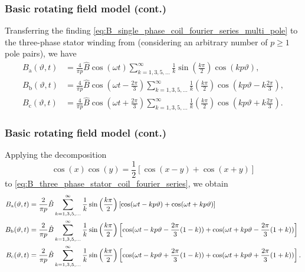 \begin{frame}
	\frametitle{Basic rotating field model (cont.)}
    Transferring the finding \eqref{eq:B_single_phase_coil_fourier_series_multi_pole} to the three-phase stator winding from  (considering an arbitrary number of $p \geq 1$ pole pairs), we have
    \begin{equation}
        \begin{split}
            B_\mathrm{a}(\vartheta, t) &= \frac{4}{\pi p} \hat{B} \cos(\omega t)\sum_{k=1,3,5,\ldots}^{\infty}   \frac{1}{k}\sin\left(\frac{k \pi}{2}\right) \cos(k p \vartheta),\\
            B_\mathrm{b}(\vartheta, t) &= \frac{4}{\pi p} \hat{B} \cos\left(\omega t - \frac{2\pi}{3}\right)\sum_{k=1,3,5,\ldots}^{\infty}   \frac{1}{k}\left(\frac{k \pi}{2}\right) \cos\left(k p \vartheta - k\frac{2\pi}{3} \right),\\ 
            B_\mathrm{c}(\vartheta, t) &= \frac{4}{\pi p} \hat{B} \cos\left(\omega t + \frac{2\pi}{3}\right)\sum_{k=1,3,5,\ldots}^{\infty}   \frac{1}{k}\left(\frac{k \pi}{2}\right) \cos\left(k p \vartheta +  k \frac{2\pi}{3}\right).
        \end{split}
        \label{eq:B_three_phase_stator_coil_fourier_series}
    \end{equation}
\end{frame}

\begin{frame}
	\frametitle{Basic rotating field model (cont.)}
    Applying the decomposition $$\cos(x)\cos(y) = \frac{1}{2} \left[ \cos(x-y) + \cos(x+y) \right]$$ to \eqref{eq:B_three_phase_stator_coil_fourier_series}, we obtain
    \begin{equation*}
        \small
        \begin{split}
            B_\mathrm{a}(\vartheta, t) &= \frac{2}{\pi p} \hat{B} \sum_{k=1,3,5,\ldots}^{\infty}   \frac{1}{k}\sin\left(\frac{k \pi}{2}\right)\left[\cos(\omega t - k p \vartheta) + \cos(\omega t + k p \vartheta)\right]\\
            B_\mathrm{b}(\vartheta, t) &= \frac{2}{\pi p} \hat{B} \sum_{k=1,3,5,\ldots}^{\infty}   \frac{1}{k}\sin\left(\frac{k \pi}{2}\right)\left[\cos(\omega t - k p \vartheta - \frac{2\pi}{3}(1-k)) + \cos(\omega t + k p \vartheta - \frac{2\pi}{3}(1+k))\right]\\
            B_\mathrm{c}(\vartheta, t) &= \frac{2}{\pi p} \hat{B} \sum_{k=1,3,5,\ldots}^{\infty}   \frac{1}{k}\sin\left(\frac{k \pi}{2}\right)\left[\cos(\omega t - k p \vartheta + \frac{2\pi}{3}(1-k)) + \cos(\omega t + k p \vartheta + \frac{2\pi}{3}(1+k))\right].
        \end{split}
    \end{equation*}

\end{frame}

